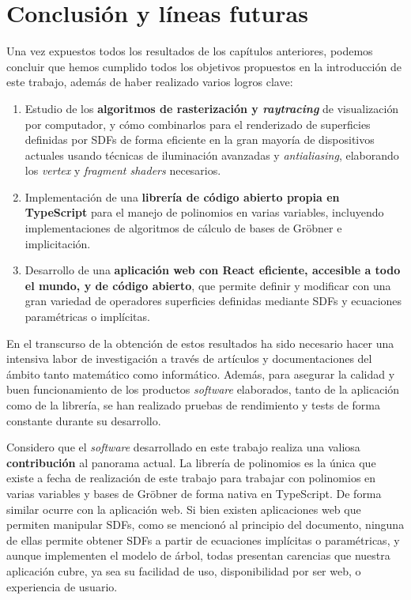\chapter{Conclusión y líneas futuras}\label{chapter5}

Una vez expuestos todos los resultados de los capítulos anteriores, podemos concluir que hemos cumplido todos los objetivos propuestos en la introducción de este trabajo, además de haber realizado varios logros clave:
\begin{enumerate}
    \item Estudio de los \textbf{algoritmos de rasterización y \textit{raytracing}} de visualización por computador, y cómo combinarlos para el renderizado de superficies definidas por SDFs de forma eficiente en la gran mayoría de dispositivos actuales usando técnicas de iluminación avanzadas y \textit{antialiasing}, elaborando los \textit{vertex} y \textit{fragment shaders} necesarios.
    \item Implementación de una \textbf{librería de código abierto propia en TypeScript} para el manejo de polinomios en varias variables, incluyendo implementaciones de algoritmos de cálculo de bases de Gröbner e implicitación.
    \item Desarrollo de una \textbf{aplicación web con React eficiente, accesible a todo el mundo, y de código abierto}, que permite definir y modificar con una gran variedad de operadores superficies definidas mediante SDFs y ecuaciones paramétricas o implícitas.
\end{enumerate}
En el transcurso de la obtención de estos resultados ha sido necesario hacer una intensiva labor de investigación a través de artículos y documentaciones del ámbito tanto matemático como informático. Además, para asegurar la calidad y buen funcionamiento de los productos \textit{software} elaborados, tanto de la aplicación como de la librería, se han realizado pruebas de rendimiento y tests de forma constante durante su desarrollo.\newline

Considero que el \textit{software} desarrollado en este trabajo realiza una valiosa \textbf{contribución} al panorama actual. La librería de polinomios es la única que existe a fecha de realización de este trabajo para trabajar con polinomios en varias variables y bases de Gröbner de forma nativa en TypeScript. De forma similar ocurre con la aplicación web. Si bien existen aplicaciones web que permiten manipular SDFs, como se mencionó al principio del documento, ninguna de ellas permite obtener SDFs a partir de ecuaciones implícitas o paramétricas, y aunque implementen el modelo de árbol, todas presentan carencias que nuestra aplicación cubre, ya sea su facilidad de uso, disponibilidad por ser web, o experiencia de usuario.\newline

